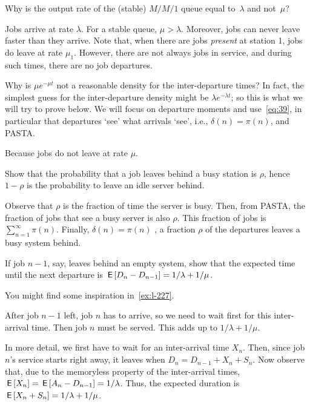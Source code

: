 \documentclass[companion]{subfiles}
\begin{document}
\begin{extra}
Why is the output rate of the (stable) $M/M/1$ queue equal to~$\lambda$ and not~$\mu$?
\begin{solution}
  Jobs arrive at rate $\lambda$.
  For a stable queue, $\mu>\lambda$.
  Moreover, jobs can never leave faster than they arrive.
  Note that, when there are jobs \emph{present} at station 1, jobs do leave at rate $\mu_1$.
  However, there are not always jobs in service, and during such times, there are no job departures.
\end{solution}
\end{extra}


\begin{extra}
 Why is $\mu e^{-\mu t}$ not a reasonable density for the inter-departure times?
 In fact, the simplest guess for the inter-departure density might be $\lambda e^{-\lambda t}$; so this is what we will try to prove below.
We will focus on departure moments and use~\cref{eq:39}, in particular that departures `see' what arrivals `see', i.e., $\delta(n)= \pi(n)$, and PASTA.
\begin{solution}
 Because jobs do not leave at rate $\mu$. 
\end{solution}
\end{extra}




\begin{extra}
Show that the probability that a job leaves behind a busy station is $\rho$, hence $1-\rho$ is the probability to leave an idle server behind.
\begin{solution}
Observe that $\rho$ is the fraction of time the server is busy. Then, from PASTA, the fraction of jobs that see a busy server is also $\rho$. This fraction of jobs is $\sum_{n=1}^\infty \pi(n)$. Finally, $\delta(n) = \pi(n)$ , a fraction $\rho$ of the departures leaves a busy system behind.

\end{solution}
\end{extra}


\begin{extra}
 If job $n-1$, say, leaves behind an empty system, show that the expected time until the next departure is $\,\mathsf{E}\left[D_n - D_{n-1}\right] = 1/\lambda + 1/\mu$. 
\begin{hint}
 You might find some inspiration in~\cref{ex:l-227}. 
\end{hint}
\begin{solution}
 After job $n-1$ left, job $n$ has to arrive, so we need to wait first for this inter-arrival time. Then job $n$ must be served. This adds up to $1/\lambda + 1/\mu$. 

In more detail, we first have to wait for an inter-arrival
 time $X_n$. Then, since job $n$'s service starts right away, it
 leaves when $D_n = D_{n-1}+X_n + S_n$. Now observe that, due to the memoryless property of the inter-arrival times, $\,\mathsf{E}\left[X_n\right] = \,\mathsf{E}\left[A_n - D_{n-1}\right] = 1/\lambda$. Thus, the expected duration is $\,\mathsf{E}\left[X_n + S_n\right]=1/\lambda + 1/\mu$. 
\end{solution}
\end{extra}
\end{document}
